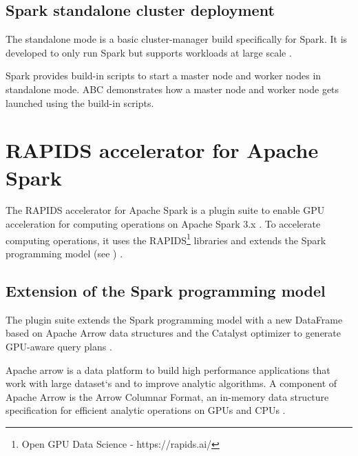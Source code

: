 \subsection{Spark standalone cluster deployment}
The standalone mode is a basic cluster-manager build specifically for Spark. It is developed to only run Spark but supports workloads at large scale \cite{Chambers2018Spark}.

Spark provides build-in scripts to start a master node and worker nodes in standalone mode. ABC demonstrates how a master node and worker node gets launched using the build-in scripts.


\section{RAPIDS accelerator for Apache Spark}
The RAPIDS accelerator for Apache Spark is a plugin suite to enable GPU acceleration for computing operations on Apache Spark 3.x \cite{SparkRapids2020Docs}. 
To accelerate computing operations, it uses the RAPIDS\footnote{Open GPU Data Science - https://rapids.ai/} libraries and extends the Spark programming model (see ) \cite{SparkRapids2020Docs, Mcdonald2020SparkRapids}.

\subsection{Extension of the Spark programming model}
The plugin suite extends the Spark programming model with a new DataFrame based on Apache Arrow\cite{ApacheArrow2020Docs} data structures and the Catalyst optimizer to generate GPU-aware query plans \cite{Mcdonald2020SparkRapids}.


Apache arrow is a data platform to build high performance applications that work with large dataset`s and to improve analytic algorithms. A component of Apache Arrow is the Arrow Columnar Format, an in-memory data structure specification for efficient analytic operations on GPUs and CPUs \cite{ApacheArrow2020Docs}.


